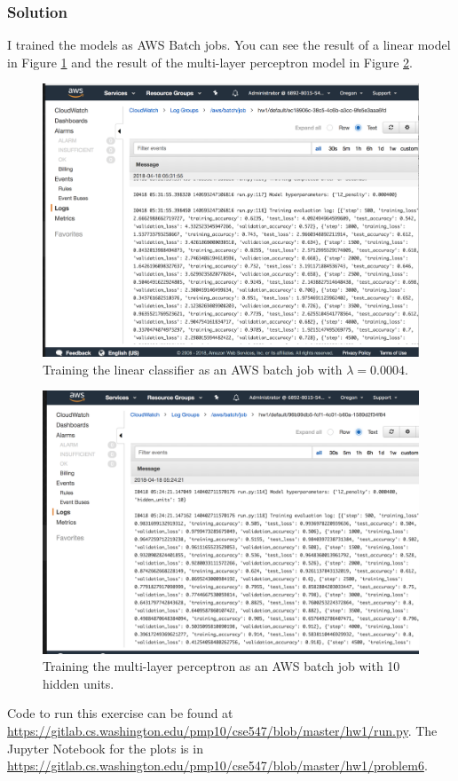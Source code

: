 \documentclass[letterpaper,11pt]{article}
\begin{document}
\subsubsection*{Solution}

I trained the models as AWS Batch jobs. You can see the result of a linear model
in Figure \ref{fig:linear_batch} and the result of the multi-layer perceptron
model in Figure \ref{fig:mlp_batch}.

\begin{figure}
  \centering
  \includegraphics[width=\textwidth]{linear_screenshot.png}
  \caption{Training the linear classifier as an AWS batch job with $\lambda = 0.0004$.}
  \label{fig:linear_batch}
\end{figure}

\begin{figure}
  \centering
  \includegraphics[width=\textwidth]{mlp_10_screenshot.png}
  \caption{Training the multi-layer perceptron as an AWS batch job with 10 hidden units.}
  \label{fig:mlp_batch}
\end{figure}

Code to run this exercise can be found at
\url{https://gitlab.cs.washington.edu/pmp10/cse547/blob/master/hw1/run.py}. The
Jupyter Notebook for the plots is in
\url{https://gitlab.cs.washington.edu/pmp10/cse547/blob/master/hw1/problem6}.
\end{document}
